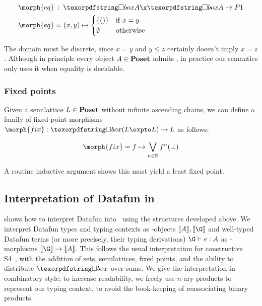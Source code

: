 \begin{align*}
  \morph{eq} &\isa \iso A \x \iso A \to \pfinof{\terminalobject}\\
  \morph{eq} &= (x,y) \mapsto 
  \begin{cases}
    \{()\} &\text{if }x = y\\
    \emptyset &\text{otherwise}
  \end{cases}
\end{align*}

\noindent
The domain must be discrete, since $x = y$ and $y \le z$ certainly doesn't imply $x = z$. Although in principle every object $A \in \textrm{\bfseries Poset}$ admits , in practice our semantics only uses it when equality is decidable.


\subsubsection{Fixed points}

Given a semilattice $L \in \textrm{\bfseries Poset}$ without infinite ascending chains, we can
define a family of fixed point morphisms $\morph{fix} : \iso (L \expto L) \to L$
as follows:

\begin{displaymath}
  \morph{fix} = f \mapsto \bigvee_{n \in \mathbb{N}} f^n(\bot)
\end{displaymath}

\noindent
A routine inductive argument shows this must yield a least fixed point.
%


\subsection{Interpretation of Datafun in \Poset}
\label{section-semantics}



 shows how to interpret Datafun into \Poset\ using the
structures developed above.
%
We interpret Datafun types and typing contexts as \Poset-objects $\den{A},
\den{\G}$ and well-typed Datafun terms (or more precisely, their typing
derivations) $\J e \G A$ as \Poset-morphisms $\den{\G} \to \den A$.
%
This follows the usual interpretation for constructive S4~\citep{depaiva-s4},
with the addition of sets, semilattices, fixed points, and the ability to
distribute $\iso$ over sums.
%
We give the interpretation in combinatory style; to increase readability, we
freely use $n$-ary products to represent our typing context, to avoid the
book-keeping of reassociating binary products.


